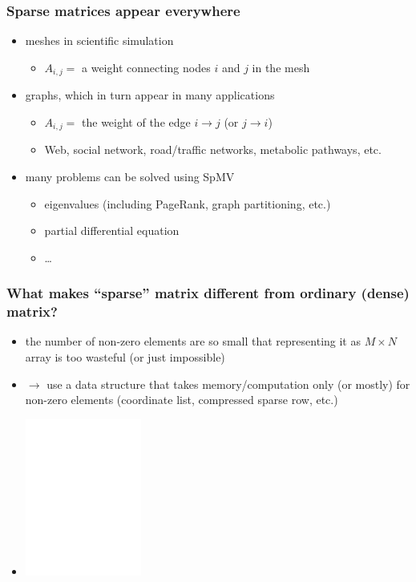 \documentclass[12pt,dvipdfmx]{beamer}
\newcommand{\ao}[1]{{\color{blue}#1}}
\begin{document}
\begin{frame}
  \frametitle{Sparse matrices appear everywhere}
  \begin{itemize}
  \item \ao{meshes} in scientific simulation
    \begin{itemize}
    \item $A_{i,j} = $ a weight connecting nodes $i$ and $j$ in the mesh
    \end{itemize}

  \item \ao{graphs}, which in turn appear in many applications
    \begin{itemize}
    \item $A_{i,j} = $ the weight of the edge $i \rightarrow j$ (or $j \rightarrow i$)
    \item Web, social network, road/traffic networks,
      metabolic pathways, etc.
    \end{itemize}
    
  \item many problems can be solved using SpMV
    \begin{itemize}
    \item eigenvalues (including PageRank, graph partitioning, etc.)
    \item partial differential equation
    \item \ldots
    \end{itemize}
  \end{itemize}
\end{frame}

\begin{frame}
  \frametitle{What makes ``sparse''
    matrix different from ordinary (dense) matrix?}

  \begin{itemize}
  \item the number of non-zero elements are so small that
    representing it as $M \times N$ array is too wasteful
    (or just impossible)
  \item $\rightarrow$ use a data structure that takes memory/computation
    only (or mostly) for non-zero elements
    (coordinate list, compressed sparse row, etc.)
  \item []
      \begin{center}
        \includegraphics[width=0.3\textwidth]{out/pdf/svg/spmv.pdf}
      \end{center}
  \end{itemize}

\end{frame}
\end{document}
